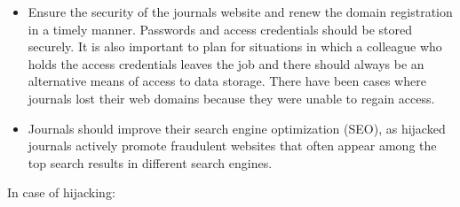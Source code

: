 \documentclass[a4paper,
fontsize=11pt,
oneside,
numbers=noperiodatend,
parskip=half-,
bibliography=totoc,
final
]{scrartcl}
\begin{document}
\begin{itemize}
\item
  Ensure the security of the journal\textquotesingle s website and renew
  the domain registration in a timely manner. Passwords and access
  credentials should be stored securely. It is also important to plan
  for situations in which a colleague who holds the access credentials
  leaves the job and there should always be an alternative means of
  access to data storage. There have been cases where journals lost
  their web domains because they were unable to regain access.
\item
  Journals should improve their search engine optimization (SEO), as
  hijacked journals actively promote fraudulent websites that often
  appear among the top search results in different search engines.
\end{itemize}

In case of hijacking:
\end{document}
